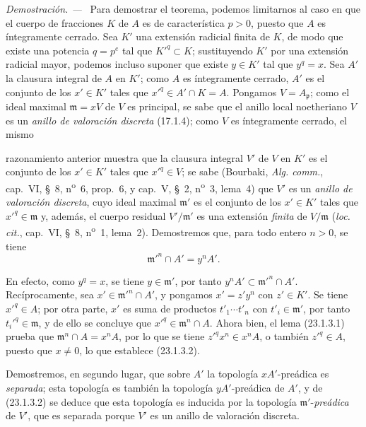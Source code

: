 \documentclass[10pt,oneside]{book}
\newcommand{\oldpage}[2][]{%
  \setcounter{footnote}{0}%
  \marginpar{\scriptsize\textbf{#1}~|~#2}\ignorespaces}
\newenvironment{proof}{%
  \par\medskip\noindent\textit{Demostración. ---\ }}{\par}
\begin{document}
\begin{proof}
Para demostrar el teorema, podemos limitarnos al caso en que el cuerpo de fracciones
$K$ de $A$ es de característica $p>0$, puesto que $A$ es íntegramente cerrado.
Sea $K'$ una extensión radicial finita de $K$, de modo que existe una
potencia $q=p^e$ tal que $K'^q\subset K$; sustituyendo $K'$ por una
extensión radicial mayor, podemos incluso suponer que existe $y\in K'$ tal
que $y^q=x$. Sea $A'$ la clausura integral de $A$ en $K'$; como
$A$ es íntegramente cerrado, $A'$ es el conjunto de los $x'\in K'$ tales que
$x'^q\in A'\cap K=A$. Pongamos $V=A_{\mathfrak p}$; como el ideal maximal
$\mathfrak m=xV$ de $V$ es principal, se sabe que el anillo local
noetheriano $V$ es un \emph{anillo de valoración discreta} (17.1.4); como
$V$ es íntegramente cerrado, el mismo

\oldpage[0\textsubscript{IV-1}]{215}

razonamiento anterior muestra que la clausura integral $V'$ de $V$ en
$K'$ es el conjunto de los $x'\in K'$ tales que $x'^q\in V$; se sabe
(Bourbaki, \emph{Alg. comm.}, cap.~VI, §~8, n\textsuperscript{o}~6,
prop.~6, y cap.~V, §~2, n\textsuperscript{o}~3, lema~4) que $V'$ es un
\emph{anillo de valoración discreta}, cuyo ideal maximal $\mathfrak m'$ es
el conjunto de los $x'\in K'$ tales que $x'^q\in\mathfrak m$ y, además, el cuerpo
residual $V'/\mathfrak m'$ es una extensión \emph{finita} de
$V/\mathfrak m$ (\emph{loc. cit.}, cap.~VI, §~8,
n\textsuperscript{o}~1, lema~2). Demostremos que, para todo entero $n>0$, se tiene
\begin{equation}
\label{0.23.1.3.2-es}
  \mathfrak m'^n\cap A'=y^nA'.
  \tag{23.1.3.2}
\end{equation}

En efecto, como $y^q=x$, se tiene $y\in\mathfrak m'$, por tanto
$y^nA'\subset\mathfrak m'^n\cap A'$. Recíprocamente, sea
$x'\in\mathfrak m'^n\cap A'$, y pongamos $x'=z'y^n$ con $z'\in K'$. Se tiene
$x'^q\in A$; por otra parte, $x'$ es suma de productos
$t'_1\cdots t'_n$ con $t'_i\in\mathfrak m'$, por tanto
$t_i'^q\in\mathfrak m$, y de ello se concluye que
$x'^q\in\mathfrak m^n\cap A$. Ahora bien, el lema (23.1.3.1) prueba que
$\mathfrak m^n\cap A=x^nA$, por lo que se tiene $z'^qx^n\in x^nA$, o también
$z'^q\in A$, puesto que $x\neq0$, lo que establece (23.1.3.2).

Demostremos, en segundo lugar, que sobre $A'$ la topología $xA'$-preádica es
\emph{separada}; esta topología es también la topología $yA'$-preádica de
$A'$, y de (23.1.3.2) se deduce que esta topología es inducida por la
topología $\mathfrak m'$-\emph{preádica} de $V'$, que es separada porque $V'$ es
un anillo de valoración discreta.


\end{proof}
\end{document}
